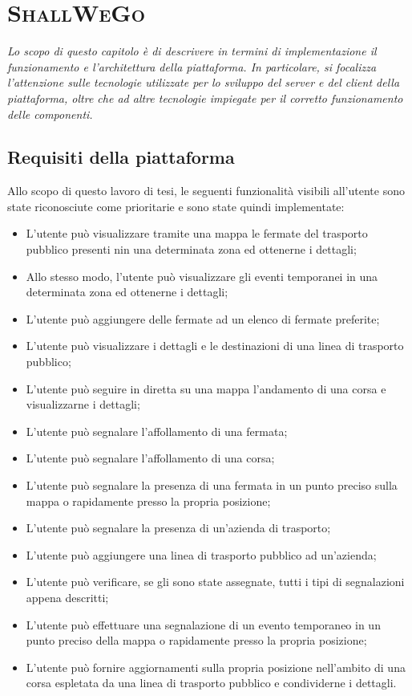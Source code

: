 \chapter{\textsc{ShallWeGo}}
\newenvironment{code}{\captionsetup{type=listing}}{}

\begin{citazione}
    \textit{Lo scopo di questo capitolo è di descrivere in termini di implementazione il funzionamento e l'architettura della piattaforma. In particolare, si focalizza l'attenzione sulle tecnologie utilizzate per lo sviluppo del server e del client della piattaforma, oltre che ad altre tecnologie impiegate per il corretto funzionamento delle componenti.}
\end{citazione}

\newpage

\section{Requisiti della piattaforma}
    Allo scopo di questo lavoro di tesi, le seguenti funzionalità visibili all'utente sono state riconosciute come prioritarie e sono state quindi implementate:

    \begin{itemize}
        \item L'utente può visualizzare tramite una mappa le fermate del trasporto pubblico presenti nin una determinata zona ed ottenerne i dettagli;
        \item Allo stesso modo, l'utente può visualizzare gli eventi temporanei in una determinata zona ed ottenerne i dettagli;
        \item L'utente può aggiungere delle fermate ad un elenco di fermate preferite;
        \item L'utente può visualizzare i dettagli e le destinazioni di una linea di trasporto pubblico;
        \item L'utente può seguire in diretta su una mappa l'andamento di una corsa e visualizzarne i dettagli;
        \item L'utente può segnalare l'affollamento di una fermata;
        \item L'utente può segnalare l'affollamento di una corsa;
        \item L'utente può segnalare la presenza di una fermata in un punto preciso sulla mappa o rapidamente presso la propria posizione;
        \item L'utente può segnalare la presenza di un'azienda di trasporto;
        \item L'utente può aggiungere una linea di trasporto pubblico ad un'azienda;
        \item L'utente può verificare, se gli sono state assegnate, tutti i tipi di segnalazioni appena descritti;
        \item L'utente può effettuare una segnalazione di un evento temporaneo in un punto preciso della mappa o rapidamente presso la propria posizione;
        \item L'utente può fornire aggiornamenti sulla propria posizione nell'ambito di una corsa espletata da una linea di trasporto pubblico e condividerne i dettagli.
    \end{itemize}

